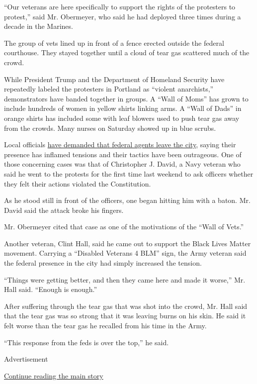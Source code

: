 ``Our veterans are here specifically to support the rights of the
protesters to protest,'' said Mr. Obermeyer, who said he had deployed
three times during a decade in the Marines.

The group of vets lined up in front of a fence erected outside the
federal courthouse. They stayed together until a cloud of tear gas
scattered much of the crowd.

While President Trump and the Department of Homeland Security have
repeatedly labeled the protesters in Portland as ``violent anarchists,''
demonstrators have banded together in groups. A ``Wall of Moms'' has
grown to include hundreds of women in yellow shirts linking arms. A
``Wall of Dads'' in orange shirts has included some with leaf blowers
used to push tear gas away from the crowds. Many nurses on Saturday
showed up in blue scrubs.

Local officials
\href{https://www.nytimes3xbfgragh.onion/2020/07/23/us/portland-protest-tear-gas-mayor.html}{have
demanded that federal agents leave the city}, saying their presence has
inflamed tensions and their tactics have been outrageous. One of those
concerning cases was that of Christopher J. David, a Navy veteran who
said he went to the protests for the first time last weekend to ask
officers whether they felt their actions violated the Constitution.

As he stood still in front of the officers, one began hitting him with a
baton. Mr. David said the attack broke his fingers.

Mr. Obermeyer cited that case as one of the motivations of the ``Wall of
Vets.''

Another veteran, Clint Hall, said he came out to support the Black Lives
Matter movement. Carrying a ``Disabled Veterans 4 BLM'' sign, the Army
veteran said the federal presence in the city had simply increased the
tension.

``Things were getting better, and then they came here and made it
worse,'' Mr. Hall said. ``Enough is enough.''

After suffering through the tear gas that was shot into the crowd, Mr.
Hall said that the tear gas was so strong that it was leaving burns on
his skin. He said it felt worse than the tear gas he recalled from his
time in the Army.

``This response from the feds is over the top,'' he said.

Advertisement

\protect\hyperlink{after-bottom}{Continue reading the main story}

